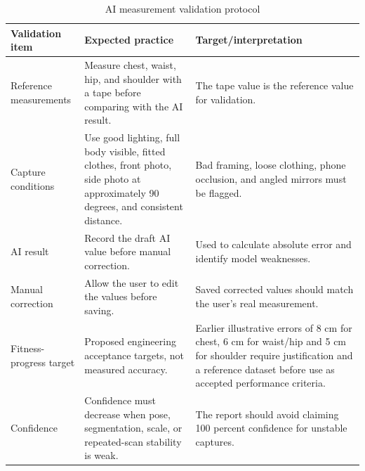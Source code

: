 \documentclass[12pt,a4paper,openany]{report}
\begin{document}
\begingroup
\footnotesize
\setlength{\tabcolsep}{3pt}
\renewcommand{\arraystretch}{1.20}
\setlength{\LTpre}{5pt}
\setlength{\LTpost}{10pt}
\begin{longtable}{|L{3.67cm}|L{5.29cm}|L{5.73cm}|}
\caption{AI measurement validation protocol}\label{tab:pdf-62-28} \\
\hline
Validation item & Expected practice & Target/interpretation \\ \hline
Reference measurements & Measure chest, waist, hip, and shoulder with a tape before comparing with the AI result. & The tape value is the reference value for validation. \\ \hline
Capture conditions & Use good lighting, full body visible, fitted clothes, front photo, side photo at approximately 90 degrees, and consistent distance. & Bad framing, loose clothing, phone occlusion, and angled mirrors must be flagged. \\ \hline
AI result & Record the draft AI value before manual correction. & Used to calculate absolute error and identify model weaknesses. \\ \hline
Manual correction & Allow the user to edit the values before saving. & Saved corrected values should match the user's real measurement. \\ \hline
Fitness-progress target & Proposed engineering acceptance targets, not measured accuracy. & Earlier illustrative errors of 8 cm for chest, 6 cm for waist/hip and 5 cm for shoulder require justification and a reference dataset before use as accepted performance criteria. \\ \hline
Confidence & Confidence must decrease when pose, segmentation, scale, or repeated-scan stability is weak. & The report should avoid claiming 100 percent confidence for unstable captures. \\ \hline
\end{longtable}
\endgroup
\end{document}
